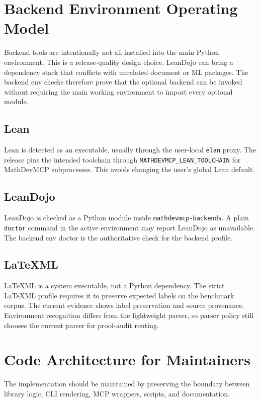 \documentclass[12pt,a4paper,openany]{book}
\begin{document}
\chapter{Backend Environment Operating Model}

Backend tools are intentionally not all installed into the main Python
environment. This is a release-quality design choice. LeanDojo can bring a
dependency stack that conflicts with unrelated document or ML packages. The
backend env checks therefore prove that the optional backend can be invoked
without requiring the main working environment to import every optional module.

\section{Lean}

Lean is detected as an executable, usually through the user-local
\texttt{elan} proxy. The release pins the intended toolchain through
\texttt{MATHDEVMCP\_LEAN\_TOOLCHAIN} for MathDevMCP subprocesses. This avoids
changing the user's global Lean default.

\section{LeanDojo}

LeanDojo is checked as a Python module inside \texttt{mathdevmcp-backends}. A
plain \texttt{doctor} command in the active environment may report LeanDojo as
unavailable. The backend env doctor is the authoritative check for the backend
profile.

\section{LaTeXML}

LaTeXML is a system executable, not a Python dependency. The strict LaTeXML
profile requires it to preserve expected labels on the benchmark corpus. The
current evidence shows label preservation and source provenance. Environment
recognition differs from the lightweight parser, so parser policy still chooses
the current parser for proof-audit routing.

\chapter{Code Architecture for Maintainers}

The implementation should be maintained by preserving the boundary between
library logic, CLI rendering, MCP wrappers, scripts, and documentation.
\end{document}
